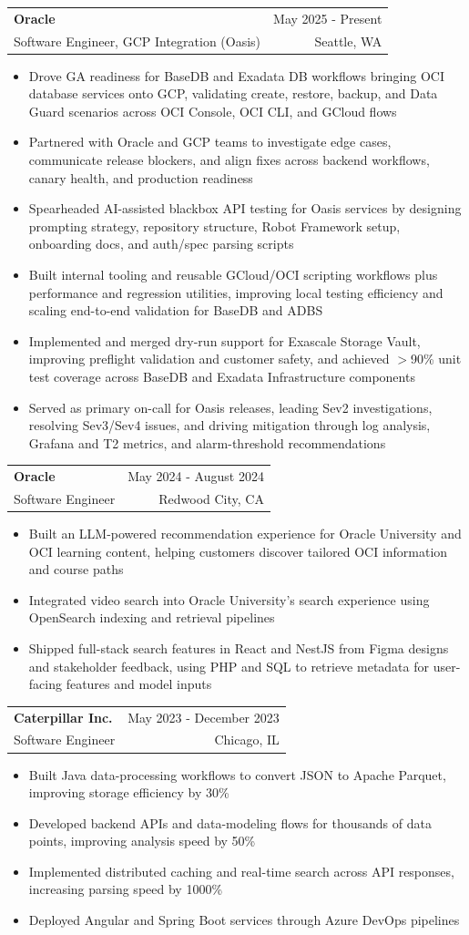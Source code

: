 \documentclass[letterpaper,11pt]{article}
\makeatletter
\newcommand{\resumeItem}[1]{
  \item\small{
    {#1 \vspace{-2pt}}
  }
}
\newcommand{\resumeSubheading}[4]{
  \vspace{-2pt}\item
    \begin{tabular*}{0.97\textwidth}[t]{l@{\extracolsep{\fill}}r}
      \textbf{#1} & #2 \\
      {\small#3} & {\small #4} \\
    \end{tabular*}\vspace{-7pt}
}
\newcommand{\resumeItemListStart}{\begin{itemize}}
\newcommand{\resumeItemListEnd}{\end{itemize}\vspace{-5pt}}
\makeatother
\begin{document}
    \resumeSubheading
  {Oracle}{May 2025 - Present}
  {Software Engineer, GCP Integration (Oasis)}{Seattle, WA}
  \resumeItemListStart
    \resumeItem{Drove GA readiness for BaseDB and Exadata DB workflows bringing OCI database services onto GCP, validating create, restore, backup, and Data Guard scenarios across OCI Console, OCI CLI, and GCloud flows}
    \resumeItem{Partnered with Oracle and GCP teams to investigate edge cases, communicate release blockers, and align fixes across backend workflows, canary health, and production readiness}
    \resumeItem{Spearheaded AI-assisted blackbox API testing for Oasis services by designing prompting strategy, repository structure, Robot Framework setup, onboarding docs, and auth/spec parsing scripts}
    \resumeItem{Built internal tooling and reusable GCloud/OCI scripting workflows plus performance and regression utilities, improving local testing efficiency and scaling end-to-end validation for BaseDB and ADBS}
    \resumeItem{Implemented and merged dry-run support for Exascale Storage Vault, improving preflight validation and customer safety, and achieved $>$90\% unit test coverage across BaseDB and Exadata Infrastructure components}
    \resumeItem{Served as primary on-call for Oasis releases, leading Sev2 investigations, resolving Sev3/Sev4 issues, and driving mitigation through log analysis, Grafana and T2 metrics, and alarm-threshold recommendations}
  \resumeItemListEnd

    \resumeSubheading
      {Oracle}{May 2024 - August 2024}
      {Software Engineer}{Redwood City, CA}
      \resumeItemListStart
        \resumeItem{Built an LLM-powered recommendation experience for Oracle University and OCI learning content, helping customers discover tailored OCI information and course paths}
        \resumeItem{Integrated video search into Oracle University's search experience using OpenSearch indexing and retrieval pipelines}
        \resumeItem{Shipped full-stack search features in React and NestJS from Figma designs and stakeholder feedback, using PHP and SQL to retrieve metadata for user-facing features and model inputs}
      \resumeItemListEnd

    \resumeSubheading
      {Caterpillar Inc.}{May 2023 - December 2023}
      {Software Engineer}{Chicago, IL}
      \resumeItemListStart
        \resumeItem{Built Java data-processing workflows to convert JSON to Apache Parquet, improving storage efficiency by 30\%}
        \resumeItem{Developed backend APIs and data-modeling flows for thousands of data points, improving analysis speed by 50\%}
        \resumeItem{Implemented distributed caching and real-time search across API responses, increasing parsing speed by 1000\%}
        \resumeItem{Deployed Angular and Spring Boot services through Azure DevOps pipelines}
      \resumeItemListEnd
\end{document}
